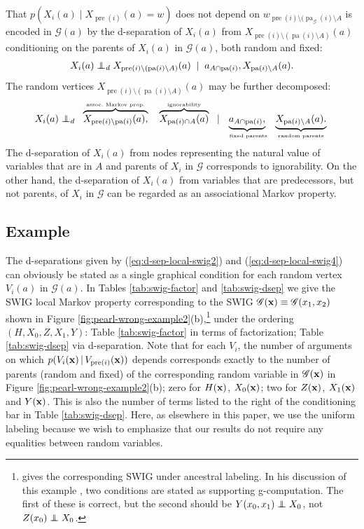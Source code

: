 \documentclass[11pt]{article}
\DeclareMathOperator{\pa}{pa}
\DeclareMathOperator{\pre}{pre}
\newcommand{\G}{{\mathscr G}}
\newcommand\indep{\protect\mathpalette{\protect\independenT}{\perp}}
\def\independenT#1#2{\mathrel{\rlap{$#1#2$}\mkern2.5mu{#1#2}}}
\newcommand\indepd{\protect\mathpalette{\protect\independenTd}{\perp}}
\def\independenTd#1#2{\mathrel{\rlap{$#1#2$}\mkern2.5mu{#1#2}_d}}
\begin{document}
  That $p(X_i({a}) \mid X_{\pre(i)}({a})\!=\! w )$ does not depend on $w_{\pre(i) \setminus (\pa_{\G}(i)\setminus A}$ is encoded in $\G(a)$ by the d-separation of $X_i({a})$ from $X_{\pre(i) \setminus (\pa(i)\setminus A)}(a)$ conditioning on 
the parents of $X_i(a)$ in $\G(a)$, both random and fixed:
 \begin{align}\label{eq:d-sep-local-swig3}
 X_i({a}) \indepd X_{\pre(i) \setminus (\pa(i)\setminus A)}(a) \;\mid\; a_{A\cap \pa(i)}, X_{\pa(i)\setminus A}(a).
 \end{align}
The random vertices $X_{\pre(i) \setminus (\pa(i)\setminus A)}(a)$ may be further decomposed:
 \begin{align}\label{eq:d-sep-local-swig4}
 X_i({a}) \indepd \;\;\overbrace{X_{\pre(i)\setminus \pa(i)}(a),}^{\hbox{\tiny assoc.~Markov prop.}} \quad \overbrace{X_{\pa(i) \cap A}(a)}^{\hbox{\tiny ignorability}} \;\;\mid 
 \underbrace{a_{A \cap \pa(i)},}_{\hbox{\tiny~~ fixed parents~~}}
\underbrace{X_{\pa(i) \setminus A}(a).}_{\hbox{\tiny ~~random parents~~}}
 \end{align}
The d-separation of $X_i(a)$ from nodes representing the natural value of variables that are in $A$ and parents of $X_i$ in $\G$ corresponds to ignorability. On the other hand, the d-separation of $X_i(a)$ from variables that are predecessors, but not parents, of $X_i$ in $\G$ can be regarded as an associational Markov property.



\subsection{Example}

The d-separations given by (\ref{eq:d-sep-local-swig2}) and (\ref{eq:d-sep-local-swig4}) can obviously be stated as a single graphical condition for each random vertex $V_i(a)$ in $\G(a)$. In Tables \ref{tab:swig-factor} and \ref{tab:swig-dsep} we give the SWIG local Markov property corresponding to the SWIG $\G({\bf x}) \equiv \G(x_1,x_2)$ shown in Figure \ref{fig:pearl-wrong-example2}(b),\footnote{\citet[Figure 15]{dawid:2021} gives the corresponding SWIG under ancestral labeling. In his discussion of this example \citet[Figure 15]{dawid:2021}, two conditions are stated as supporting g-computation. The first of these is correct, but the second should be $Y(x_0,x_1) \indep X_0$, not $Z(x_0) \indep X_0$.} under the ordering $(H,X_0,Z,X_1,Y)$:
 Table \ref{tab:swig-factor} in terms of factorization; Table \ref{tab:swig-dsep} via d-separation.
Note that for each $V_i$, the number  of arguments on which $p(V_i({\bf x}) \,|\, V_{\pre(i)}({\bf x}))$ depends corresponds exactly to the number of parents (random and fixed) of the corresponding random variable in $\G({\bf x})$ in Figure \ref{fig:pearl-wrong-example2}(b); zero for $H(\bf{x})$, $X_0(\bf{x})$; two for $Z(\bf{x})$, $X_1(\bf{x})$ and $Y(\bf{x})$. This is also the number of terms listed to the right of the conditioning bar in Table \ref{tab:swig-dsep}.
Here, as elsewhere in this paper, we use the uniform labeling because we wish to emphasize that our results do not require any equalities between random variables. 
\end{document}
